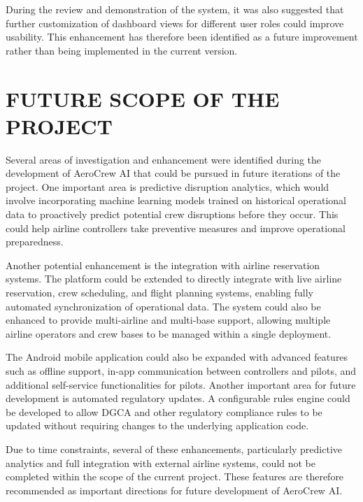 \documentclass[12pt,a4paper]{report}
\begin{document}
During the review and demonstration of the system, it was also suggested that further customization of dashboard views for different user roles could improve usability. This enhancement has therefore been identified as a future improvement rather than being implemented in the current version.

\section{FUTURE SCOPE OF THE PROJECT}

Several areas of investigation and enhancement were identified during the development of AeroCrew AI that could be pursued in future iterations of the project. One important area is predictive disruption analytics, which would involve incorporating machine learning models trained on historical operational data to proactively predict potential crew disruptions before they occur. This could help airline controllers take preventive measures and improve operational preparedness.

Another potential enhancement is the integration with airline reservation systems. The platform could be extended to directly integrate with live airline reservation, crew scheduling, and flight planning systems, enabling fully automated synchronization of operational data. The system could also be enhanced to provide multi-airline and multi-base support, allowing multiple airline operators and crew bases to be managed within a single deployment.

The Android mobile application could also be expanded with advanced features such as offline support, in-app communication between controllers and pilots, and additional self-service functionalities for pilots. Another important area for future development is automated regulatory updates. A configurable rules engine could be developed to allow DGCA and other regulatory compliance rules to be updated without requiring changes to the underlying application code.

Due to time constraints, several of these enhancements, particularly predictive analytics and full integration with external airline systems, could not be completed within the scope of the current project. These features are therefore recommended as important directions for future development of AeroCrew AI.
\end{document}
